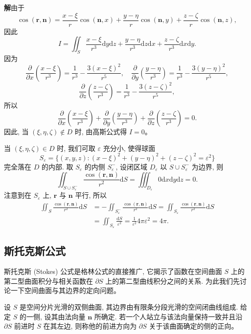 \documentclass[UTF8, 12pt, fontset=fandol, oneside]{ctexart}
\begin{document}
\noindent\textbf{解}\quad 由于
\[
  \cos(\boldsymbol r,\boldsymbol n)
  =\frac{x-\xi}{r}\cos(\boldsymbol n,x)
   +\frac{y-\eta}{r}\cos(\boldsymbol n,y)
   +\frac{z-\zeta}{r}\cos(\boldsymbol n,z),
\]
因此
\[
  I=\iint_S\frac{x-\xi}{r^3}\mathrm dy\mathrm dz
    +\frac{y-\eta}{r^3}\mathrm dz\mathrm dx
    +\frac{z-\zeta}{r^3}\mathrm dx\mathrm dy.
\]
因为
\[
  \frac{\partial}{\partial x}\left(\frac{x-\xi}{r^3}\right)=\frac1{r^3}-\frac{3(x-\xi)^2}{r^5},\quad
  \frac{\partial}{\partial y}\left(\frac{y-\eta}{r^3}\right)=\frac1{r^3}-\frac{3(y-\eta)^2}{r^5},
\]
\[
  \frac{\partial}{\partial z}\left(\frac{z-\zeta}{r^3}\right)=\frac1{r^3}-\frac{3(z-\zeta)^2}{r^5},
\]
所以
\[
  \frac{\partial}{\partial x}\left(\frac{x-\xi}{r^3}\right)
  +\frac{\partial}{\partial y}\left(\frac{y-\eta}{r^3}\right)
  +\frac{\partial}{\partial z}\left(\frac{z-\zeta}{r^3}\right)=0.
\]
因此, 当 $(\xi,\eta,\zeta)\notin D$ 时, 由高斯公式得 $I=0$。

当 $(\xi,\eta,\zeta)\in D$ 时, 我们可取 $\varepsilon$ 充分小, 使得球面
\[
  S_\varepsilon=\{(x,y,z):(x-\xi)^2+(y-\eta)^2+(z-\zeta)^2=\varepsilon^2\}
\]
完全落在 $D$ 的内部. 取 $S_\varepsilon$ 的内侧 $S_\varepsilon^-$, 设闭区域 $D_\varepsilon$ 以 $S\cup S_\varepsilon^-$ 为边界, 则
\[
  \iint_{S\cup S_\varepsilon^-}\frac{\cos(\boldsymbol r,\boldsymbol n)}{r^2}\mathrm dS
  =\iiint_{D_\varepsilon}0\mathrm dx\mathrm dy\mathrm dz=0.
\]
注意到在 $S_\varepsilon$ 上, $\boldsymbol r$ 与 $\boldsymbol n$ 平行, 所以
\[
\begin{aligned}
  \iint_S\frac{\cos(\boldsymbol r,\boldsymbol n)}{r^2}\mathrm dS
  &=-\iint_{S_\varepsilon^-}\frac{\cos(\boldsymbol r,\boldsymbol n)}{r^2}\mathrm dS
    =\iint_{S_\varepsilon}\frac{\cos(\boldsymbol r,\boldsymbol n)}{r^2}\mathrm dS\\
  &=\iint_{S_\varepsilon}\frac{\mathrm dS}{\varepsilon^2}
    =\frac1{\varepsilon^2}4\pi\varepsilon^2=4\pi.
\end{aligned}
\]

\subsection{斯托克斯公式}

斯托克斯 (Stokes) 公式是格林公式的直接推广, 它揭示了函数在空间曲面 $S$ 上的第二型曲面积分与相关函数在 $\partial S$ 上的第二型曲线积分之间的关系. 为此我们先讨论一下空间曲面与其边界的定向问题。

设 $S$ 是空间分片光滑的双侧曲面, 其边界由有限条分段光滑的空间闭曲线组成. 给定 $S$ 的一侧, 设其由法向量 $\boldsymbol n$ 所确定. 若一个人站立与该法向量保持一致并且沿 $\partial S$ 前进时 $S$ 在其左边, 则称他的前进方向为 $\partial S$ 关于该曲面确定的侧的正向。
\end{document}
